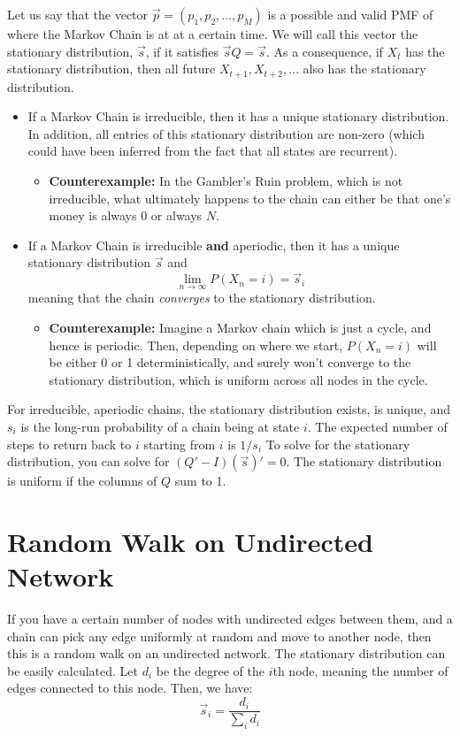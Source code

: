 \documentclass[11.5pt]{article}
\begin{document}
\begin{notes}
Let us say that the vector $\vec{p} = (p_1, p_2, \dots, p_M)$ is a possible and valid PMF of where the Markov Chain is at at a certain time. We will call this vector the stationary distribution, $\vec{s}$, if it satisfies $\vec{s}Q = \vec{s}$. As a consequence, if $X_t$ has the stationary distribution, then all future $X_{t+1}, X_{t + 2}, \dots$ also has the stationary distribution. 
\begin{itemize}
\item If a Markov Chain is irreducible, then it has a unique stationary distribution. In addition, all entries of this stationary distribution are non-zero (which could have been inferred from the fact that all states are recurrent).
\begin{itemize}
\item \textbf{Counterexample: } In the Gambler's Ruin problem, which is not irreducible, what ultimately happens to the chain can either be that one's money is always $0$ or always $N$. 
\end{itemize} 
\item If a Markov Chain is irreducible \textbf{and} aperiodic, then it has a unique stationary distribution $\vec{s}$ and $$ \lim_{n \to \infty} P(X_n = i) = \vec{s}_i$$
 meaning that the chain \textit{converges} to the stationary distribution. 
\begin{itemize}
\item \textbf{Counterexample: } Imagine a Markov chain which is just a cycle, and hence is periodic. Then, depending on where we start, $P(X_n = i)$ will be either 0 or 1 deterministically, and surely won't converge to the stationary distribution, which is uniform across all nodes in the cycle. 
\end{itemize}
\end{itemize}

For irreducible, aperiodic chains, the stationary distribution exists, is unique, and $s_i$ is the long-run probability of a chain being at state $i$. The expected number of steps to return back to $i$ starting from $i$ is $1/s_i$ To solve for the stationary distribution, you can solve for $(Q' - I)(\vec{s})' = 0$. The stationary distribution is uniform if the columns of $Q$ sum to 1.



\section*{Random Walk on Undirected Network}
If you have a certain number of nodes with undirected edges between them, and a chain can pick any edge uniformly at random and move to another node, then this is a random walk on an undirected network. The stationary distribution can be easily calculated. Let $d_i$ be the degree of the $i$th node, meaning the number of edges connected to this node. Then, we have: 
$$ \vec{s}_i = \frac{d_i}{\sum_i d_i}$$


\end{notes}
\end{document}
